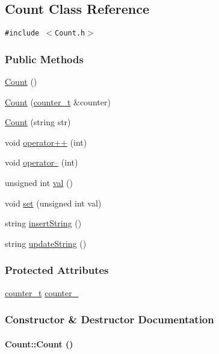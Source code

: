 \hypertarget{classCount}{
\subsection{Count Class Reference}
\label{classCount}
}
{\tt \#include $<$Count.h$>$}

\subsubsection*{Public Methods}
\begin{CompactItemize}
\item 
\hyperlink{classCount_Counta0}{Count} ()
\item 
\hyperlink{classCount_Counta1}{Count} (\hyperlink{Count_8h_a0}{counter\_\-t} \&counter)
\item 
\hyperlink{classCount_Counta2}{Count} (string str)
\item 
void \hyperlink{classCount_Counta3}{operator++} (int)
\item 
void \hyperlink{classCount_Counta4}{operator--} (int)
\item 
unsigned int \hyperlink{classCount_Counta5}{val} ()
\item 
void \hyperlink{classCount_Counta6}{set} (unsigned int val)
\item 
string \hyperlink{classCount_Counta7}{insert\-String} ()
\item 
string \hyperlink{classCount_Counta8}{update\-String} ()
\end{CompactItemize}
\subsubsection*{Protected Attributes}
\begin{CompactItemize}
\item 
\hyperlink{Count_8h_a0}{counter\_\-t} \hyperlink{classCount_Countn0}{counter\_\-}
\end{CompactItemize}


\subsubsection{Constructor \& Destructor Documentation}
\hypertarget{classCount_Counta0}{
\paragraph[Count]{\setlength{\rightskip}{0pt plus 5cm}Count::Count ()}\hfill}
\label{classCount_Counta0}


